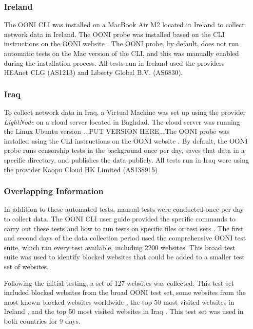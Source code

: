 \subsubsection{Ireland}

The OONI CLI was installed on a MacBook Air M2 located in Ireland to collect network data in Ireland. The OONI probe was installed based on the CLI instructions on the OONI website \cite{OONISCLI}. The OONI probe, by default, does not run automatic tests on the Mac version of the CLI, and this was manually enabled during the installation process. All tests run in Ireland used the providers HEAnet CLG (AS1213) and Liberty Global B.V. (AS6830).

\subsubsection{Iraq}

To collect network data in Iraq, a Virtual Machine was set up using the provider \textit{LightNode} \cite{lightnodeLightNodeGlobal} on a cloud server located in Baghdad. The cloud server was running the Linux Ubuntu version ...PUT VERSION HERE...The OONI probe was installed using the CLI instructions on the OONI website \cite{OONISCLI}. By default, the OONI probe runs censorship tests in the background once per day, saves that data in a specific directory, and publishes the data publicly. All tests run in Iraq were using the provider Kaopu Cloud HK Limited (AS138915)

\subsubsection{Overlapping Information}

In addition to these automated tests, manual tests were conducted once per day to collect data. The OONI CLI user guide provided the specific commands to carry out these tests and how to run tests on specific files or test sets \cite{ooniUserGuideCLI}. The first and second days of the data collection period used the comprehensive OONI test suite, which ran every test available, including 2200 websites. This broad test suite was used to identify blocked websites that could be added to a smaller test set of websites.

Following the initial testing, a set of 127 websites was collected. This test set included blocked websites from the broad OONI test set, some websites from the most known blocked websites worldwide \cite{blocksiteMostBlocked}, the top 50 most visited websites in Ireland \cite{top50irishwebsites}, and the top 50 most visited websites in Iraq \cite{top50IraqWebsites}. This test set was used in both countries for 9 days.

